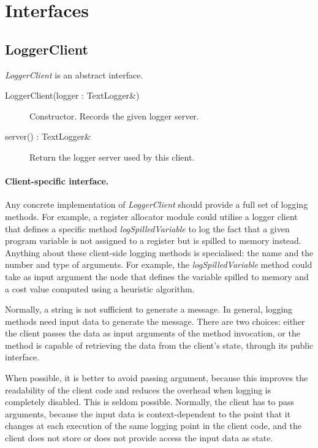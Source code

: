 \documentclass[a4paper,twoside]{tce}
\begin{document}
\section{Interfaces}

\subsection{LoggerClient}
\label{ssec:LoggerClient-if}

\emph{LoggerClient} is an abstract interface.
\begin{description}
\item[LoggerClient(logger : TextLogger\&)]%
  Constructor. Records the given logger server.
\item[server() : TextLogger\&]%
  Return the logger server used by this client.
\end{description}

\paragraph{Client-specific interface.}

Any concrete implementation of \emph{LoggerClient} should provide a full set
of logging methods. For example, a register allocator module could utilise a
logger client that defines a specific method \emph{logSpilledVariable} to
log the fact that a given program variable is not assigned to a register but
is spilled to memory instead. Anything about these client-side logging
methods is specialised: the name and the number and type of arguments. For
example, the \emph{logSpilledVariable} method could take as input argument
the node that defines the variable spilled to memory and a cost value
computed using a heuristic algorithm.

Normally, a string is not sufficient to generate a message. In general,
logging methods need input data to generate the message. There are two
choices: either the client passes the data as input arguments of the method
invocation, or the method is capable of retrieving the data from the
client's state, through its public interface.

When possible, it is better to avoid passing argument, because this improves
the readability of the client code and reduces the overhead when logging is
completely disabled.
%
This is seldom possible. Normally, the client has to pass arguments, because
the input data is context-dependent to the point that it changes at each
execution of the same logging point in the client code, and the client does
not store or does not provide access the input data as state.
\end{document}
